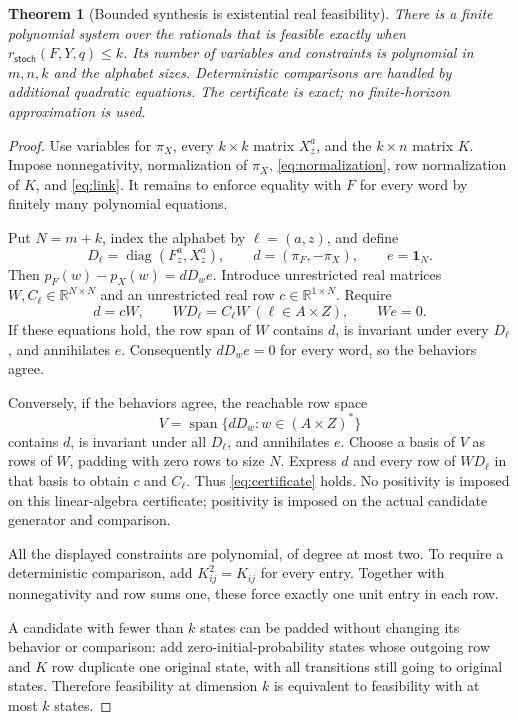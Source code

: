 \documentclass[11pt]{article}
\newtheorem{theorem}{Theorem}[section]
\newcommand{\one}{\mathbf{1}}
\newcommand{\R}{\mathbb{R}}
\newcommand{\diag}{\operatorname{diag}}
\begin{document}
\begin{theorem}[Bounded synthesis is existential real feasibility]
There is a finite polynomial system over the rationals that is feasible exactly when $r_{\mathsf{stoch}}(F,Y,q)\leq k$. Its number of variables and constraints is polynomial in $m,n,k$ and the alphabet sizes. Deterministic comparisons are handled by additional quadratic equations. The certificate is exact; no finite-horizon approximation is used.
\end{theorem}
\begin{proof}
Use variables for $\pi_X$, every $k\times k$ matrix $X_z^a$, and the $k\times n$ matrix $K$. Impose nonnegativity, normalization of $\pi_X$, \eqref{eq:normalization}, row normalization of $K$, and \eqref{eq:link}. It remains to enforce equality with $F$ for every word by finitely many polynomial equations.

Put $N=m+k$, index the alphabet by $\ell=(a,z)$, and define
\[
 D_\ell=\diag(F_z^a,X_z^a),\qquad
 d=(\pi_F,-\pi_X),\qquad e=\one_N.
\]
Then $p_F(w)-p_X(w)=dD_we$. Introduce unrestricted real matrices $W,C_\ell\in\R^{N\times N}$ and an unrestricted real row $c\in\R^{1\times N}$. Require
\begin{equation}
 d=cW,\qquad WD_\ell=C_\ell W\ (\ell\in A\times Z),
 \qquad We=0.
 \label{eq:certificate}
\end{equation}
If these equations hold, the row span of $W$ contains $d$, is invariant under every $D_\ell$, and annihilates $e$. Consequently $dD_we=0$ for every word, so the behaviors agree.

Conversely, if the behaviors agree, the reachable row space
\[
 V=\operatorname{span}\{dD_w:w\in(A\times Z)^*\}
\]
contains $d$, is invariant under all $D_\ell$, and annihilates $e$. Choose a basis of $V$ as rows of $W$, padding with zero rows to size $N$. Express $d$ and every row of $WD_\ell$ in that basis to obtain $c$ and $C_\ell$. Thus \eqref{eq:certificate} holds. No positivity is imposed on this linear-algebra certificate; positivity is imposed on the actual candidate generator and comparison.

All the displayed constraints are polynomial, of degree at most two. To require a deterministic comparison, add $K_{ij}^2=K_{ij}$ for every entry. Together with nonnegativity and row sums one, these force exactly one unit entry in each row.

A candidate with fewer than $k$ states can be padded without changing its behavior or comparison: add zero-initial-probability states whose outgoing row and $K$ row duplicate one original state, with all transitions still going to original states. Therefore feasibility at dimension $k$ is equivalent to feasibility with at most $k$ states.
\end{proof}
\end{document}
